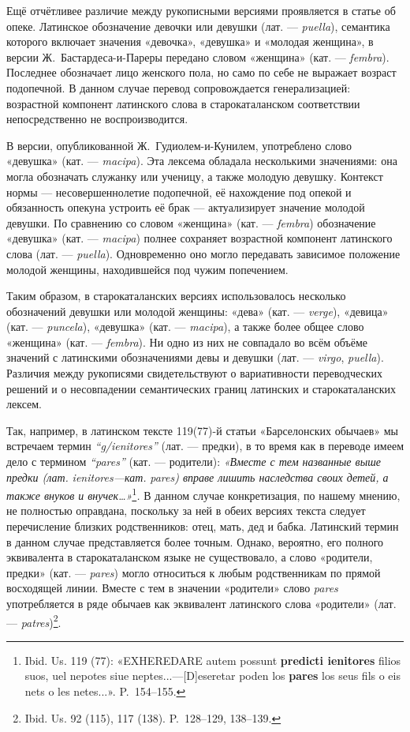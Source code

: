 Ещё отчётливее различие между рукописными версиями проявляется в статье об опеке. Латинское обозначение девочки или девушки (лат. --- \emph{puella}), семантика которого включает значения «девочка», «девушка» и «молодая женщина», в версии Ж.~Бастардеса-и-Пареры передано словом «женщина» (кат. --- \emph{fembra}). Последнее обозначает лицо женского пола, но само по себе не выражает возраст подопечной. В данном случае перевод сопровождается генерализацией: возрастной компонент латинского слова в старокаталанском соответствии непосредственно не воспроизводится.

В версии, опубликованной Ж.~Гудиолем-и-Кунилем, употреблено слово «девушка» (кат. --- \emph{macipa}). Эта лексема обладала несколькими значениями: она могла обозначать служанку или ученицу, а также молодую девушку. Контекст нормы --- несовершеннолетие подопечной, её нахождение под опекой и обязанность опекуна устроить её брак --- актуализирует значение молодой девушки. По сравнению со словом «женщина» (кат. --- \emph{fembra}) обозначение «девушка» (кат. --- \emph{macipa}) полнее сохраняет возрастной компонент латинского слова (лат. --- \emph{puella}). Одновременно оно могло передавать зависимое положение молодой женщины, находившейся под чужим попечением.

Таким образом, в старокаталанских версиях использовалось несколько обозначений девушки или молодой женщины: «дева» (кат. --- \emph{verge}), «девица» (кат. --- \emph{puncela}), «девушка» (кат. --- \emph{macipa}), а также более общее слово «женщина» (кат. --- \emph{fembra}). Ни одно из них не совпадало во всём объёме значений с латинскими обозначениями девы и девушки (лат. --- \emph{virgo}, \emph{puella}). Различия между рукописями свидетельствуют о вариативности переводческих решений и о несовпадении семантических границ латинских и старокаталанских лексем.

Так, например, в латинском тексте 119(77)-й статьи «Барселонских обычаев» мы встречаем термин \emph{“}\emph{g}\emph{/}\emph{ienitores}\emph{”} (лат. --- предки), в то время как в переводе имеем дело с термином \emph{“}\emph{pares}\emph{”} (кат. --- родители): \emph{«Вместе с тем названные выше предки (лат. }\emph{ienitores}\emph{---кат. }\emph{pares}\emph{) вправе лишить наследства своих детей, а также внуков и внучек…»}\footnote{Ibid. Us. 119 (77): «EXHEREDARE autem possunt \textbf{predicti ienitores} filios suos, uel nepotes siue neptes...---[D]eseretar poden los \textbf{pares} los seus fils o eis nets o les netes...». P.~154--155.}\emph{.} В данном случае конкретизация, по нашему мнению, не полностью оправдана, поскольку за ней в обеих версиях текста следует перечисление близких родственников: отец, мать, дед и бабка. Латинский термин в данном случае представляется более точным. Однако, вероятно, его полного эквивалента в старокаталанском языке не существовало, а слово «родители, предки» (кат. --- \emph{pares}) могло относиться к любым родственникам по прямой восходящей линии. Вместе с тем в значении «родители» слово \emph{pares} употребляется в ряде обычаев как эквивалент латинского слова «родители» (лат. --- \emph{patres})\footnote{Ibid. Us. 92 (115), 117 (138). P.~128--129, 138--139.}.

